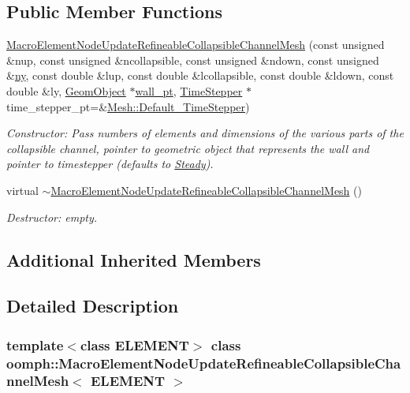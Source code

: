 \subsection*{Public Member Functions}
\begin{DoxyCompactItemize}
\item 
\hyperlink{classoomph_1_1MacroElementNodeUpdateRefineableCollapsibleChannelMesh_a6e3dfbb3d4dee7897d59aa10cde2dab1}{Macro\+Element\+Node\+Update\+Refineable\+Collapsible\+Channel\+Mesh} (const unsigned \&nup, const unsigned \&ncollapsible, const unsigned \&ndown, const unsigned \&\hyperlink{classoomph_1_1SimpleRectangularQuadMesh_a45011f22dedd480392b1f376e4269921}{ny}, const double \&lup, const double \&lcollapsible, const double \&ldown, const double \&ly, \hyperlink{classoomph_1_1GeomObject}{Geom\+Object} $\ast$\hyperlink{classoomph_1_1CollapsibleChannelMesh_a04ffeb61678763dfd250962ea9ba614b}{wall\+\_\+pt}, \hyperlink{classoomph_1_1TimeStepper}{Time\+Stepper} $\ast$time\+\_\+stepper\+\_\+pt=\&\hyperlink{classoomph_1_1Mesh_a12243d0fee2b1fcee729ee5a4777ea10}{Mesh\+::\+Default\+\_\+\+Time\+Stepper})
\begin{DoxyCompactList}\small\item\em Constructor\+: Pass numbers of elements and dimensions of the various parts of the collapsible channel, pointer to geometric object that represents the wall and pointer to timestepper (defaults to \hyperlink{classoomph_1_1Steady}{Steady}). \end{DoxyCompactList}\item 
virtual \hyperlink{classoomph_1_1MacroElementNodeUpdateRefineableCollapsibleChannelMesh_a5f0960e124d26e10cc70e2143744a07f}{$\sim$\+Macro\+Element\+Node\+Update\+Refineable\+Collapsible\+Channel\+Mesh} ()
\begin{DoxyCompactList}\small\item\em Destructor\+: empty. \end{DoxyCompactList}\end{DoxyCompactItemize}
\subsection*{Additional Inherited Members}


\subsection{Detailed Description}
\subsubsection*{template$<$class E\+L\+E\+M\+E\+NT$>$\newline
class oomph\+::\+Macro\+Element\+Node\+Update\+Refineable\+Collapsible\+Channel\+Mesh$<$ E\+L\+E\+M\+E\+N\+T $>$}

